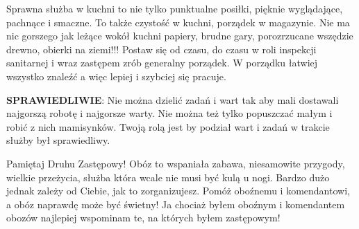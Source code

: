 Sprawna służba w  kuchni to nie tylko punktualne posiłki, pięknie wyglądające,  pachnące  i  smaczne. To także czystość  w  kuchni, porządek w magazynie. Nie ma nic gorszego jak leżące wokół kuchni papiery, brudne gary, porozrzucane wszędzie drewno, obierki na ziemi!!! Postaw się od czasu, do czasu w roli inspekcji sanitarnej i wraz zastępem zrób generalny porządek. W  porządku  łatwiej  wszystko  znaleźć a więc  lepiej  i szybciej się  pracuje.

\textbf{SPRAWIEDLIWIE}: Nie  można dzielić zadań i wart tak aby mali dostawali najgorszą  robotę i najgorsze warty. Nie można też tylko popuszczać małym i robić z nich mamisynków. Twoją rolą jest by podział wart i zadań w trakcie służby był sprawiedliwy.

	Pamiętaj Druhu Zastępowy! Obóz to  wspaniała zabawa,  niesamowite przygody, wielkie przeżycia, służba która wcale nie musi być kulą u nogi. Bardzo dużo jednak zależy od Ciebie, jak to zorganizujesz. Pomóż oboźnemu i komendantowi, a obóz naprawdę może być świetny!
	Ja chociaż byłem oboźnym i komendantem obozów najlepiej wspominam te, na których byłem zastępowym!
